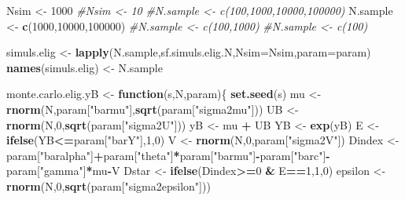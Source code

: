 \documentclass[]{book}
\newenvironment{Shaded}{\begin{snugshade}}{\end{snugshade}}
\newcommand{\KeywordTok}[1]{\textcolor[rgb]{0.13,0.29,0.53}{\textbf{#1}}}
\newcommand{\DataTypeTok}[1]{\textcolor[rgb]{0.13,0.29,0.53}{#1}}
\newcommand{\DecValTok}[1]{\textcolor[rgb]{0.00,0.00,0.81}{#1}}
\newcommand{\StringTok}[1]{\textcolor[rgb]{0.31,0.60,0.02}{#1}}
\newcommand{\CommentTok}[1]{\textcolor[rgb]{0.56,0.35,0.01}{\textit{#1}}}
\newcommand{\ControlFlowTok}[1]{\textcolor[rgb]{0.13,0.29,0.53}{\textbf{#1}}}
\newcommand{\OperatorTok}[1]{\textcolor[rgb]{0.81,0.36,0.00}{\textbf{#1}}}
\newcommand{\NormalTok}[1]{#1}
\theoremstyle{definition}
\theoremstyle{definition}
\theoremstyle{definition}
\theoremstyle{remark}
\begin{document}
\begin{Shaded}
\begin{Highlighting}[]
\NormalTok{Nsim <-}\StringTok{ }\DecValTok{1000}
\CommentTok{#Nsim <- 10}
\CommentTok{#N.sample <- c(100,1000,10000,100000)}
\NormalTok{N.sample <-}\StringTok{ }\KeywordTok{c}\NormalTok{(}\DecValTok{1000}\NormalTok{,}\DecValTok{10000}\NormalTok{,}\DecValTok{100000}\NormalTok{)}
\CommentTok{#N.sample <- c(100,1000)}
\CommentTok{#N.sample <- c(100)}

\NormalTok{simuls.elig <-}\StringTok{ }\KeywordTok{lapply}\NormalTok{(N.sample,sf.simuls.elig.N,}\DataTypeTok{Nsim=}\NormalTok{Nsim,}\DataTypeTok{param=}\NormalTok{param)}
\KeywordTok{names}\NormalTok{(simuls.elig) <-}\StringTok{ }\NormalTok{N.sample}
\end{Highlighting}
\end{Shaded}

\begin{Shaded}
\begin{Highlighting}[]
\NormalTok{monte.carlo.elig.yB <-}\StringTok{ }\ControlFlowTok{function}\NormalTok{(s,N,param)\{}
  \KeywordTok{set.seed}\NormalTok{(s)}
\NormalTok{  mu <-}\StringTok{ }\KeywordTok{rnorm}\NormalTok{(N,param[}\StringTok{"barmu"}\NormalTok{],}\KeywordTok{sqrt}\NormalTok{(param[}\StringTok{"sigma2mu"}\NormalTok{]))}
\NormalTok{  UB <-}\StringTok{ }\KeywordTok{rnorm}\NormalTok{(N,}\DecValTok{0}\NormalTok{,}\KeywordTok{sqrt}\NormalTok{(param[}\StringTok{"sigma2U"}\NormalTok{]))}
\NormalTok{  yB <-}\StringTok{ }\NormalTok{mu }\OperatorTok{+}\StringTok{ }\NormalTok{UB }
\NormalTok{  YB <-}\StringTok{ }\KeywordTok{exp}\NormalTok{(yB)}
\NormalTok{  E <-}\StringTok{ }\KeywordTok{ifelse}\NormalTok{(YB}\OperatorTok{<=}\NormalTok{param[}\StringTok{"barY"}\NormalTok{],}\DecValTok{1}\NormalTok{,}\DecValTok{0}\NormalTok{)}
\NormalTok{  V <-}\StringTok{ }\KeywordTok{rnorm}\NormalTok{(N,}\DecValTok{0}\NormalTok{,param[}\StringTok{"sigma2V"}\NormalTok{])}
\NormalTok{  Dindex <-}\StringTok{ }\NormalTok{param[}\StringTok{"baralpha"}\NormalTok{]}\OperatorTok{+}\NormalTok{param[}\StringTok{"theta"}\NormalTok{]}\OperatorTok{*}\NormalTok{param[}\StringTok{"barmu"}\NormalTok{]}\OperatorTok{-}\NormalTok{param[}\StringTok{"barc"}\NormalTok{]}\OperatorTok{-}\NormalTok{param[}\StringTok{"gamma"}\NormalTok{]}\OperatorTok{*}\NormalTok{mu}\OperatorTok{-}\NormalTok{V}
\NormalTok{  Dstar <-}\StringTok{ }\KeywordTok{ifelse}\NormalTok{(Dindex}\OperatorTok{>=}\DecValTok{0} \OperatorTok{&}\StringTok{ }\NormalTok{E}\OperatorTok{==}\DecValTok{1}\NormalTok{,}\DecValTok{1}\NormalTok{,}\DecValTok{0}\NormalTok{)}
\NormalTok{  epsilon <-}\StringTok{ }\KeywordTok{rnorm}\NormalTok{(N,}\DecValTok{0}\NormalTok{,}\KeywordTok{sqrt}\NormalTok{(param[}\StringTok{"sigma2epsilon"}\NormalTok{]))}

\end{Highlighting}
\end{Shaded}
\end{document}
